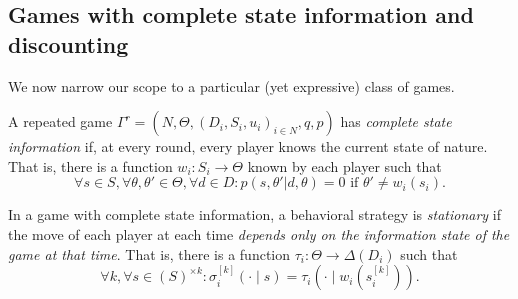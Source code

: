 \subsection{Games with complete state information and discounting}

We now narrow our scope to a particular (yet expressive) class of games.
\begin{definition}
A repeated game $\Gamma^r = (N, \Theta, (D_i, S_i, u_i)_{i \in N}, q, p) $ has \emph{complete state information}
if, at every round, every player knows the current state of nature. That is, there is a function $w_i : S_i \rightarrow \Theta$ known by each player such that
$$\forall s \in S, \forall \theta, \theta' \in \Theta, \forall d \in D:  p(s , \theta' | d, \theta) = 0 \text{ if } \theta' \neq w_i(s_i). $$
\end{definition}

\begin{definition}
In a game with complete state information, a behavioral strategy is \emph{stationary} if the move of each player at each time \emph{depends only on the information state of the game at that time}.
That is, there is a function $\tau_{i}: \Theta \rightarrow \Delta(D_i)$ such that
$$\forall k, \forall s \in (S)^{\times k}: \sigma_i^{[k]}(\cdot \mid s) = \tau_i(\cdot \mid w_i(s_i^{[k]})). $$
\end{definition}

